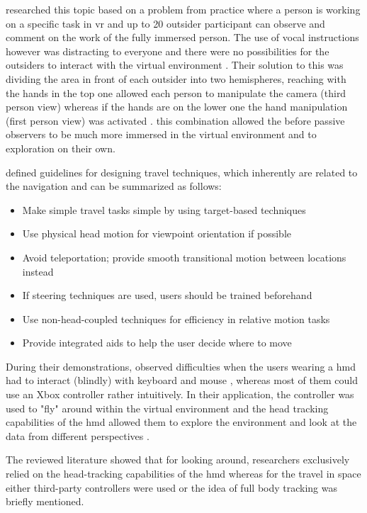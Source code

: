 \cite{Deligiannidis2003} researched this topic based on a problem from practice where a person is working on a specific task in \gls{vr} and up to 20 outsider participant can observe and comment on the work of the fully immersed person. The use of vocal instructions however was distracting to everyone and there were no possibilities for the outsiders to interact with the virtual environment \citep{Deligiannidis2003}. Their solution to this was dividing the area in front of each outsider into two hemispheres, reaching with the hands in the top one allowed each person to manipulate the camera (third person view) whereas if the hands are on the lower one the hand manipulation (first person view) was activated \citep{Deligiannidis2003}. this combination allowed the before passive observers to be much more immersed in the virtual environment and to exploration on their own.

\cite{Bowman2002} defined guidelines for designing travel techniques, which inherently are related to the navigation and can be summarized as follows:
\begin{itemize}[noitemsep,nolistsep]
	\item Make simple travel tasks simple by using target-based techniques
	\item Use physical head motion for viewpoint orientation if possible
	\item Avoid teleportation; provide smooth transitional motion between locations instead
	\item If steering techniques are used, users should be trained beforehand
	\item Use non-head-coupled techniques for efficiency in relative motion tasks
	\item Provide integrated aids to help the user decide where to move
\end{itemize}

During their demonstrations, \cite{Drouhard2015} observed difficulties when the users wearing a \gls{hmd} had to interact (blindly) with keyboard and mouse , whereas most of them could use an Xbox controller rather intuitively. In their application, the controller was used to "fly" around within the virtual environment and the head tracking capabilities of the \gls{hmd} allowed them to explore the environment and look at the data from different perspectives \citep{Drouhard2015}.

The reviewed literature showed that for looking around, researchers exclusively relied on the head-tracking capabilities of the \gls{hmd} whereas for the travel in space either third-party controllers were used or the idea of full body tracking was briefly mentioned.


